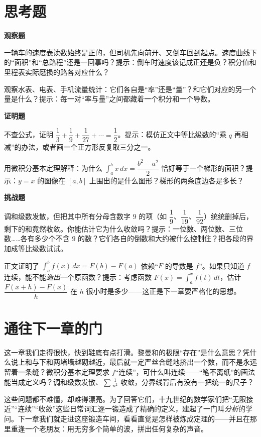 \section*{思考题}

\textbf{观察题}
\begin{sikao}
  \item 一辆车的速度表读数始终是正的，但司机先向前开、又倒车回到起点。速度曲线下的“面积”和“总路程”还是一回事吗？提示：倒车时速度该记成正还是负？积分值和里程表实际磨损的路各对应什么？
  \item 观察水表、电表、手机流量统计：它们各自是“率”还是“量”？和它们对应的另一个量是什么？提示：每一对“率与量”之间都藏着一个积分和一个导数。
\end{sikao}

\textbf{证明题}
\begin{sikao}
  \item 不查公式，证明 $\dfrac13+\dfrac19+\dfrac1{27}+\cdots=\dfrac12$。提示：模仿正文中等比级数的“乘 $q$ 再相减”的办法，或者画一个正方形反复取三分之一。
  \item 用微积分基本定理解释：为什么 $\int_a^b x\,dx=\dfrac{b^{2}-a^{2}}{2}$ 恰好等于一个梯形的面积？提示：$y=x$ 的图像在 $[a,b]$ 上围出的是什么图形？梯形的两条底边各是多长？
\end{sikao}

\textbf{挑战题}
\begin{sikao}
  \item 调和级数发散，但把其中所有分母含数字 $9$ 的项（如 $\dfrac19$、$\dfrac1{19}$、$\dfrac1{92}$）统统删掉后，剩下的和竟然收敛。你能估计它为什么收敛吗？提示：一位数、两位数、三位数……各有多少个不含 $9$ 的数？它们各自的倒数和大约被什么控制住？把各段的界加成等比级数试试。
  \item 正文证明了 $\int_a^b f(x)\,dx=F(b)-F(a)$ 依赖“$F$ 的导数是 $f$”。如果只知道 $f$ 连续，能不能\emph{造出}一个原函数？提示：考虑函数 $F(x)=\int_a^x f(t)\,dt$，估计 $\dfrac{F(x+h)-F(x)}{h}$ 在 $h$ 很小时是多少——这正是下一章要严格化的思想。
\end{sikao}

\section*{通往下一章的门}

这一章我们走得很快，快到鞋底有点打滑。黎曼和的极限“存在”是什么意思？凭什么说上和与下和两堵墙越砌越近，最后就一定严丝合缝地挤出一个数，而不是永远留着一条缝？微积分基本定理要求 $f$“连续”，可什么叫连续——“笔不离纸”的画法能当成定义吗？调和级数发散、$\sum\frac{1}{n^{2}}$ 收敛，分界线背后有没有一把统一的尺子？

这些问题都不难懂，却难得漂亮。为了回答它们，十九世纪的数学家们把“无限接近”“连续”“收敛”这些日常词汇逐一锻造成了精确的定义，建起了一门叫\emph{分析}的学问。下一章我们就走进这座锻造车间，看看直觉是怎样被炼成定理的——并且在那里重逢一个老朋友：用无穷多个简单的波，拼出任何复杂的声音。
